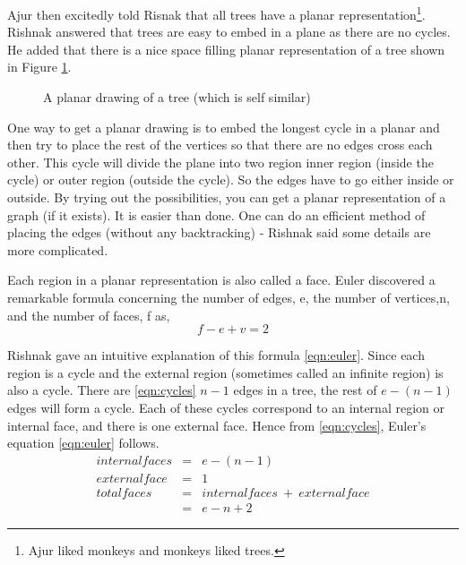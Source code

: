  Ajur then excitedly told Risnak that all trees have a planar representation\footnote{Ajur liked monkeys and monkeys liked trees.}. Rishnak answered that trees are easy to embed in a plane as there are
 no cycles. He added that there is a nice space filling planar representation of a tree shown in Figure \ref{9g7}.
\begin{figure}
\begin{center}    

  \caption{ A planar drawing of a tree (which is self similar)}\label{9g7}
  \end{center}
\end{figure}

One way to get a planar drawing is to embed the longest cycle in a planar and then try to place the rest of the vertices so that there are no edges cross each other. This cycle will divide the plane into two region inner region (inside the cycle) or outer region (outside the cycle). So the edges have to go either inside or outside. By trying out the possibilities, you can get a planar representation of a graph (if it exists). It is easier than done. One can do an efficient method of placing the edges (without any backtracking) - Rishnak said some details are more complicated. 

Each region in a planar representation is also called a face. Euler discovered a remarkable formula concerning the number of edges, e, the number of vertices,n, and the number of faces, f as,
\begin{equation}
\label{eqn:euler}
  f-e+v=2 
\end{equation}

 

Rishnak gave an intuitive explanation of this formula \ref{eqn:euler}. Since each region is a cycle and the external region (sometimes called an infinite region) is also a cycle. There are \ref{eqn:cycles} $n-1$ edges in a tree, the rest of $e-(n-1)$ edges will form a cycle. Each of these cycles correspond to an internal region or internal face, and there is one external face. Hence from \ref{eqn:cycles}, Euler's equation \ref{eqn:euler} follows.
\begin{eqnarray*}
    \label{eqn:cycles}
    internal faces&=&e-(n-1)\\
    external face&=&1\\
    total faces&=& internal faces~+~external face\\
    &=&e-n+2
\end{eqnarray*}

